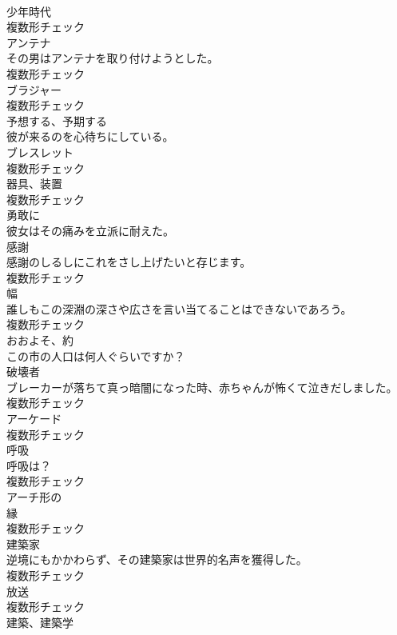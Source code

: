 \documentclass[8pt]{extreport}
\begin{document}
\begin{CJK}{UTF8}{min}
\\	[名詞]	少年時代	
\\	複数形チェック
\\	[名詞]	アンテナ	
\\	その男はアンテナを取り付けようとした。	
\\	複数形チェック
\\	[名詞]	ブラジャー	
\\	複数形チェック
\\	[動詞]	予想する、予期する	
\\	彼が来るのを心待ちにしている。	
\\	[名詞]	ブレスレット	
\\	複数形チェック
\\	[名詞]	器具、装置	
\\	複数形チェック
\\	[副詞]	勇敢に	
\\	彼女はその痛みを立派に耐えた。	
\\	[名詞]	感謝	
\\	感謝のしるしにこれをさし上げたいと存じます。	
\\	複数形チェック
\\	[名詞]	幅	
\\	誰しもこの深淵の深さや広さを言い当てることはできないであろう。	
\\	複数形チェック
\\	[形容詞]	おおよそ、約	
\\	この市の人口は何人ぐらいですか？	
\\	[名詞]	破壊者	
\\	ブレーカーが落ちて真っ暗闇になった時、赤ちゃんが怖くて泣きだしました。	
\\	複数形チェック
\\	[名詞]	アーケード	
\\	複数形チェック
\\	[名詞]	呼吸	
\\	呼吸は？	
\\	複数形チェック
\\	[形容詞]	アーチ形の	
\\	[名詞]	縁	
\\	複数形チェック
\\	[名詞]	建築家	
\\	逆境にもかかわらず、その建築家は世界的名声を獲得した。	
\\	複数形チェック
\\	[名詞]	放送	
\\	複数形チェック
\\	[名詞]	建築、建築学	

\end{CJK}
\end{document}
